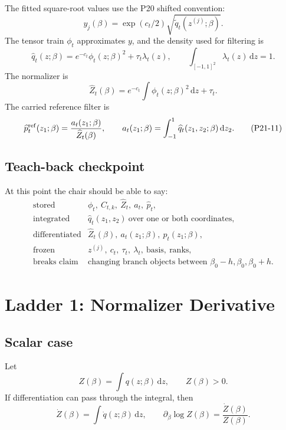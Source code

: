 \documentclass[11pt]{article}
\newcommand{\dd}{\,\mathrm d}
\newcommand{\widehatZ}{\widehat Z}
\newcommand{\widehatq}{\widehat q}
\newcommand{\widehatp}{\widehat p}
\begin{document}
The fitted square-root values use the P20 shifted convention:
\[
    y_j(\beta)
    =
    \exp(c_t/2)\sqrt{\widetilde q_t(z^{(j)};\beta)}.
    \tag{P21-8}
\]
The tensor train \(\phi_t\) approximates \(y\), and the density used for
filtering is
\[
    \widehatq_t(z;\beta)
    =
    e^{-c_t}\phi_t(z;\beta)^2+\tau_t\lambda_t(z),
    \qquad
    \int_{[-1,1]^2}\lambda_t(z)\dd z=1.
    \tag{P21-9}
\]
The normalizer is
\[
    \widehatZ_t(\beta)
    =
    e^{-c_t}\int\phi_t(z;\beta)^2\dd z+\tau_t.
    \tag{P21-10}
\]
The carried reference filter is
\[
    \widehatp_t^{\rm ref}(z_1;\beta)
    =
    \frac{
    a_t(z_1;\beta)}
    {\widehatZ_t(\beta)},
    \qquad
    a_t(z_1;\beta)=\int_{-1}^{1}\widehatq_t(z_1,z_2;\beta)\dd z_2 .
    \tag{P21-11}
\]

\subsection*{Teach-back checkpoint}

At this point the chair should be able to say:
\[
\begin{array}{ll}
\text{stored} & \phi_t,\ C_{t,k},\ \widehatZ_t,\ a_t,\ \widehatp_t,\\[1mm]
\text{integrated} & \widehatq_t(z_1,z_2)\ \text{over one or both coordinates},\\[1mm]
\text{differentiated} & \widehatZ_t(\beta),\ a_t(z_1;\beta),\ \widehatp_t(z_1;\beta),\\[1mm]
\text{frozen} & z^{(j)},\ c_t,\ \tau_t,\ \lambda_t,\ \text{basis},\ \text{ranks},\\[1mm]
\text{breaks claim} & \text{changing branch objects between }\beta_0-h,\beta_0,\beta_0+h.
\end{array}
\tag{P21-12}
\]

\section{Ladder 1: Normalizer Derivative}

\subsection*{Scalar case}

Let
\[
    Z(\beta)=\int q(z;\beta)\dd z,\qquad Z(\beta)>0.
    \tag{P21-13}
\]
If differentiation can pass through the integral, then
\[
    \dot Z(\beta)=\int \dot q(z;\beta)\dd z,
    \qquad
    \partial_\beta\log Z(\beta)=\frac{\dot Z(\beta)}{Z(\beta)}.
    \tag{P21-14}
\]
\end{document}
